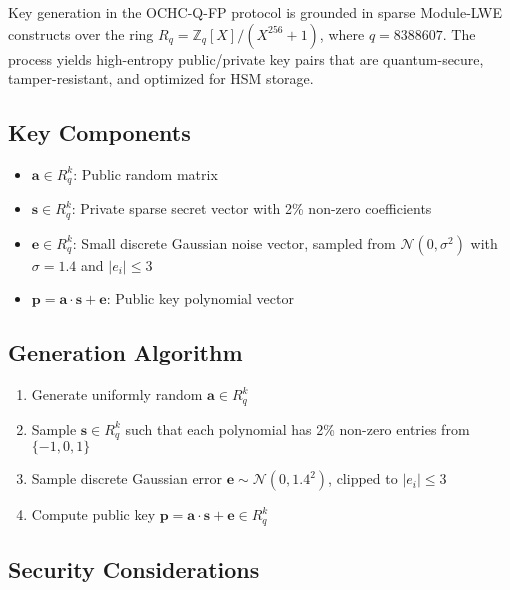 \documentclass[12pt]{article}
\begin{document}
Key generation in the OCHC-Q-FP protocol is grounded in sparse Module-LWE constructs over the ring \( R_q = \mathbb{Z}_q[X]/(X^{256} + 1) \), where \( q = 8388607 \). The process yields high-entropy public/private key pairs that are quantum-secure, tamper-resistant, and optimized for HSM storage.

\subsection*{Key Components}
\begin{itemize}
    \item \( \mathbf{a} \in R_q^k \): Public random matrix
    \item \( \mathbf{s} \in R_q^k \): Private sparse secret vector with 2\% non-zero coefficients
    \item \( \mathbf{e} \in R_q^k \): Small discrete Gaussian noise vector, sampled from \( \mathcal{N}(0, \sigma^2) \) with \( \sigma = 1.4 \) and \( |e_i| \leq 3 \)
    \item \( \mathbf{p} = \mathbf{a} \cdot \mathbf{s} + \mathbf{e} \): Public key polynomial vector
\end{itemize}

\subsection*{Generation Algorithm}

\begin{enumerate}
    \item Generate uniformly random \( \mathbf{a} \in R_q^k \)
    \item Sample \( \mathbf{s} \in R_q^k \) such that each polynomial has 2\% non-zero entries from \( \{-1, 0, 1\} \)
    \item Sample discrete Gaussian error \( \mathbf{e} \sim \mathcal{N}(0, 1.4^2) \), clipped to \( |e_i| \leq 3 \)
    \item Compute public key \( \mathbf{p} = \mathbf{a} \cdot \mathbf{s} + \mathbf{e} \in R_q^k \)
\end{enumerate}

\subsection*{Security Considerations}
\end{document}
